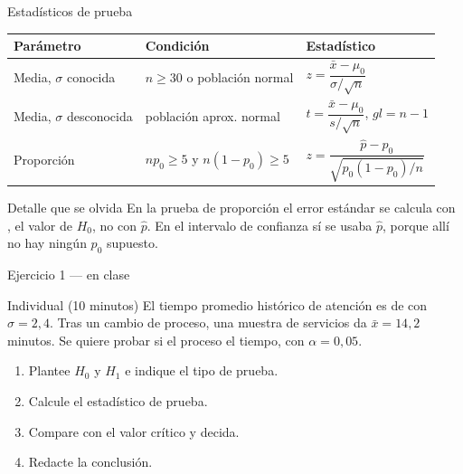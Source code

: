\documentclass[aspectratio=169,10pt]{beamer}
\begin{document}
\begin{frame}{Estadísticos de prueba}
  \footnotesize
  \begin{center}
  \begin{tabular}{@{}p{3.4cm}p{3.6cm}p{4.2cm}@{}}
    \toprule
    \textbf{Parámetro} & \textbf{Condición} & \textbf{Estadístico} \\
    \midrule
    Media, $\sigma$ conocida & $n\ge 30$ o población normal &
      $z=\dfrac{\bar{x}-\mu_0}{\sigma/\sqrt{n}}$ \\[0.8em]
    Media, $\sigma$ desconocida & población aprox. normal &
      $t=\dfrac{\bar{x}-\mu_0}{s/\sqrt{n}}$, \; $gl=n-1$ \\[0.8em]
    Proporción & $np_0\ge 5$ y $n(1-p_0)\ge 5$ &
      $z=\dfrac{\hat{p}-p_0}{\sqrt{p_0(1-p_0)/n}}$ \\
    \bottomrule
  \end{tabular}
  \end{center}

  \vspace{0.2cm}
  \begin{alertblock}{Detalle que se olvida}
    \footnotesize
    En la prueba de proporción el error estándar se calcula con
    , el valor de $H_0$, no con $\hat p$. En el intervalo de
    confianza sí se usaba $\hat p$, porque allí no hay ningún $p_0$ supuesto.
  \end{alertblock}
\end{frame}

\begin{frame}{Ejercicio 1 — en clase}
  \begin{alertblock}{Individual (10 minutos)}
    El tiempo promedio histórico de atención es de  con
    $\sigma=2{,}4$. Tras un cambio de proceso, una muestra de
     servicios da $\bar{x}=14{,}2$ minutos. Se quiere probar
    si el proceso  el tiempo, con $\alpha=0{,}05$.

    \vspace{0.25cm}
    \begin{enumerate}
      \item Plantee $H_0$ y $H_1$ e indique el tipo de prueba.
      \item Calcule el estadístico de prueba.
      \item Compare con el valor crítico y decida.
      \item Redacte la conclusión.
    \end{enumerate}
  \end{alertblock}
\end{frame}
\end{document}
